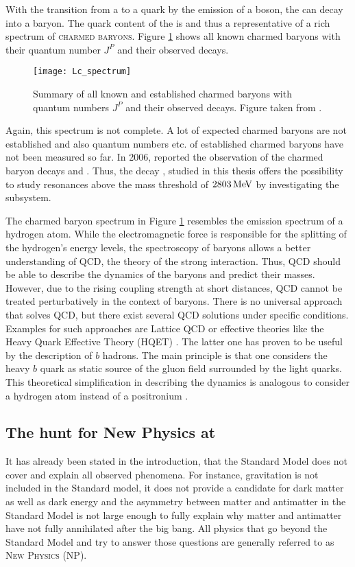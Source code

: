 With the transition from a \bquark to a \cquark quark by the emission of a \Wm boson, the \Lb can decay into a \Lc baryon.
The quark content of the \Lc is \uquark\dquark\cquark and thus a representative of a rich spectrum of \textsc{charmed baryons}.
Figure \ref{fig:Lc_spectrum} shows all known charmed baryons with their quantum number $J^P$ and their observed decays.
\begin{figure}[tb]
    \centering
	\texttt{[image: Lc\_spectrum]}	
	\caption{Summary of all known and established charmed baryons with quantum numbers $J^P$ and their observed decays. Figure taken from \cite{PDG}.}
	\label{fig:Lc_spectrum}
\end{figure}
Again, this spectrum is not complete.
A lot of expected charmed baryons are not established and also quantum numbers etc. of established charmed baryons have not been measured so far.
In 2006, \babar reported the observation of the charmed baryon decays \decay{\LcResI}{\Dz\proton} and \decay{\LcResII}{\Dz\proton} \cite{BaBar_D0p}.
Thus, the decay \LbToDpmunuX, studied in this thesis offers the possibility to study \Lc resonances above the \Dz\proton mass threshold of $2803\mathrm{\,Me\kern -0.1em V}$ by investigating the \Dz\proton subsystem.

The charmed baryon spectrum in Figure \ref{fig:Lc_spectrum} resembles the emission spectrum of a hydrogen atom.
While the electromagnetic force is responsible for the splitting of the hydrogen's energy levels, the spectroscopy of baryons allows a better understanding of QCD, the theory of the strong interaction.
Thus, QCD should be able to describe the dynamics of the baryons and predict their masses.
However, due to the rising coupling strength \as at short distances, QCD cannot be treated perturbatively in the context of baryons.
There is no universal approach that solves QCD, but there exist several QCD solutions under specific conditions.
Examples for such approaches are Lattice QCD \cite{LatticeQCD} or effective theories like the Heavy Quark Effective Theory (HQET) \cite{HQET_Introduction}.
The latter one has proven to be useful by the description of $b$ hadrons.
The main principle is that one considers the heavy $b$ quark as static source of the gluon field surrounded by the light quarks.
This theoretical simplification in describing the dynamics is analogous to consider a hydrogen atom instead of a positronium \cite{HQET_Introduction}.

\subsection{The hunt for New Physics at \lhcb}
It has already been stated in the introduction, that the Standard Model does not cover and explain all observed phenomena.
For instance, gravitation is not included in the Standard model, it does not provide a candidate for dark matter as well as dark energy and the asymmetry between matter and antimatter in the Standard Model is not large enough to fully explain why matter and antimatter have not fully annihilated after
the big bang.
All physics that go beyond the Standard Model and try to answer those questions are generally referred to as \textsc{New Physics (NP)}.

